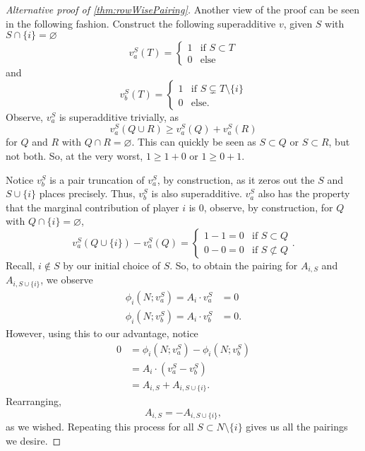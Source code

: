 \documentclass[12pt,letterpaper,final]{article}
\theoremstyle{plain}
\theoremstyle{plain}
\theoremstyle{plain}
\theoremstyle{plain}
\theoremstyle{plain}
\theoremstyle{plain}
\theoremstyle{plain}
\theoremstyle{definition}
\theoremstyle{definition}
\theoremstyle{definition}
\theoremstyle{definition}
\theoremstyle{definition}
\theoremstyle{remark}
\theoremstyle{remark}
\theoremstyle{remark}
\theoremstyle{remark}
\begin{document}
\begin{proof}[Alternative proof of \cref{thm:rowWisePairing}]
  Another view of the proof can be seen in the following fashion.
  Construct the following superadditive \(v\), given \(S\) with
  \(S\cap \{i\} = \varnothing\)  
  \[
    v^S_a(T) =
    \begin{cases}
      1 & \text{if } S \subset T\\
      0 & \text{else}
    \end{cases}
  \]
  and
  \[
    v^S_b(T) =
    \begin{cases}
      1 & \text{if } S \subsetneq T\setminus\{i\}\\
      0 & \text{else}.
    \end{cases}
  \]
  Observe, \(v^S_a\) is superadditive trivially, as
  \[
    v^S_a(Q\cup R) \geq v^S_a(Q)+v^S_a(R)
  \]
  for \(Q\) and \(R\) with \(Q\cap R=\varnothing\). This can quickly
  be seen as \(S\subset Q\) or \(S\subset R\), but not both. So,
  at the very worst, \(1\geq 1+0\) or \(1\geq 0+1\).  

  Notice \(v^S_b\) is a pair truncation of \(v^S_a\), by construction, as
  it zeros out the \(S\) and \(S\cup\{i\}\) places precisely.
  Thus, \(v^S_b\)  is also superadditive. \(v^S_a\) also has the property that
  the marginal contribution of player \(i\) is 0, observe, by
  construction, for \(Q\) with \(Q\cap\{i\} = \varnothing\), 
  \[
    v^S_a(Q\cup\{i\}) -v^S_a(Q) =
    \begin{cases}
      1 - 1 = 0 & \text{if } S\subset Q\\
      0-0 = 0 & \text{if } S \not\subset Q
    \end{cases}.
  \]
  Recall, \(i\notin S\) by our initial choice of \(S\). So, to obtain
  the pairing for \(A_{i,S}\) and \(A_{i,S\cup\{i\}}\), we observe
  \begin{align*}
    \phi_i(N;v^S_a) = A_i \cdot v^S_a &= 0\\
    \phi_i(N;v^S_b) = A_i \cdot v^S_b &= 0.
  \end{align*}
  However, using this to our advantage, notice
  \begin{align*}
    0&= \phi_i(N;v^S_a) - \phi_i(N;v^S_b) \\
     &= A_i \cdot (v^S_a-v^S_b)\\
     &= A_{i,S} + A_{i,S\cup\{i\}}.
  \end{align*}
  Rearranging,
  \begin{equation}
    A_{i,S} = -A_{i,S\cup\{i\}},
  \end{equation}
  as we wished. Repeating this process for all
  \(S\subset N\setminus\{i\}\) gives us all the pairings we desire.
\end{proof}
\end{document}
